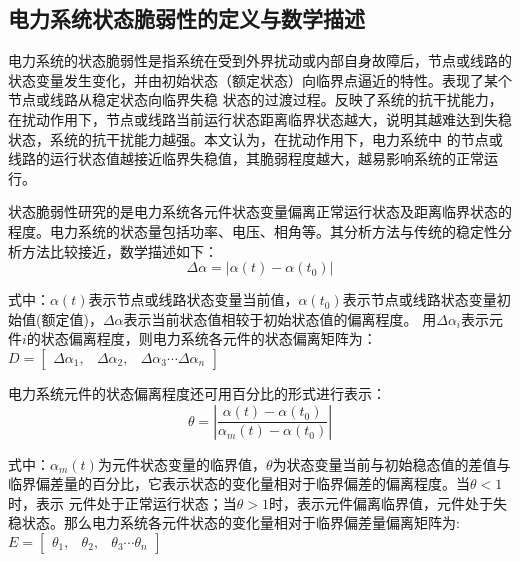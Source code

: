 \subsection{电力系统状态脆弱性的定义与数学描述}
\label{sec:vulneStaus}

电力系统的状态脆弱性是指系统在受到外界扰动或内部自身故障后，节点或线路的状态变量发生变化，并由初始状态（额定状态）向临界点逼近的特性。表现了某个节点或线路从稳定状态向临界失稳
状态的过渡过程。反映了系统的抗干扰能力，在扰动作用下，节点或线路当前运行状态距离临界状态越大，说明其越难达到失稳状态，系统的抗干扰能力越强。本文认为，在扰动作用下，电力系统中
的节点或线路的运行状态值越接近临界失稳值，其脆弱程度越大，越易影响系统的正常运行。

状态脆弱性研究的是电力系统各元件状态变量偏离正常运行状态及距离临界状态的程度。电力系统的状态量包括功率、电压、相角等。其分析方法与传统的稳定性分析方法比较接近，数学描述如下：
\begin{equation}
\Delta \alpha=\left|\alpha(t)-\alpha\left(t_{0}\right)\right|  
\end{equation}

式中：$\alpha(t)$表示节点或线路状态变量当前值，$\alpha\left(t_{0}\right)$表示节点或线路状态变量初始值(额定值)，$\Delta \alpha$表示当前状态值相较于初始状态值的偏离程度。
用$\Delta \alpha_i$表示元件$i$的状态偏离程度，则电力系统各元件的状态偏离矩阵为：$D=\left[\begin{array}{lll}{\Delta \alpha_{1},} & {\Delta \alpha_{2},} & {\Delta \alpha_{3} \cdots \Delta \alpha_{n}}\end{array}\right]$


电力系统元件的状态偏离程度还可用百分比的形式进行表示：
\begin{equation}
  \theta=\left|\frac{\alpha(t)-\alpha\left(t_{0}\right)}{\alpha_{m}(t)-\alpha\left(t_{0}\right)}\right|
  \end{equation}

式中：$\alpha_{m}(t)$为元件状态变量的临界值，$\theta$为状态变量当前与初始稳态值的差值与临界偏差量的百分比，它表示状态的变化量相对于临界偏差的偏离程度。当$\theta<1$时，表示
元件处于正常运行状态；当$\theta>1$时，表示元件偏离临界值，元件处于失稳状态。那么电力系统各元件状态的变化量相对于临界偏差量偏离矩阵为:$E=\left[\begin{array}{lll}{\theta_{1},} & {\theta_{2},} & {\theta_{3} \cdots \theta_{n}}\end{array}\right]$

